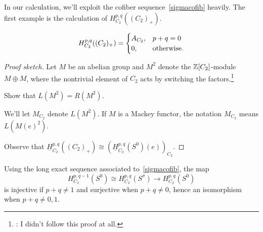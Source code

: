 In our calculation, we'll exploit the cofiber sequence~\eqref{sigmacofib} heavily. The first example is the
calculation of $H_{C_2}^{p,q}((C_2)_+)$.
\begin{prop}
\[H_{C_2}^{p,q}((C_2)_+) = \begin{cases}
	A_{C_2}, &p +q = 0\\
	0, &\text{\rm otherwise.}
\end{cases}\]
\end{prop}
\begin{proof}[Proof sketch]
Let $M$ be an abelian group and $M^2$ denote the $\mathbb Z[C_2]$-module $M\oplus M$, where the nontrivial element of
$C_2$ acts by switching the factors.\footnote{\TODO: I didn't follow this proof at all.}
\begin{ex}
Show that $L(M^2) = R(M^2)$.
\end{ex}
We'll let $M_{C_2}$ denote $L(M^2)$. If $M$ is a Mackey functor, the notation $M_{C_2}$ means $L(M(e)^2)$.

Observe that $\underline H_{C_2}^{p,q}((C_2)_+)\cong (\underline H_{C_2}^{p,q}(S^0)(e))_{C_2}$.
\end{proof}
Using the long exact sequence associated to~\eqref{sigmacofib}, the map
\[H_{C_2}^{p,q-1}(S^0)\cong H_{C_2}^{p,q}(S^\sigma)\longrightarrow H_{C_2}^{p,q}(S^0)\]
is injective if $p+q\ne 1$ and surjective when $p+q\ne 0$, hence an isomorphism when $p+q\ne 0,1$.


